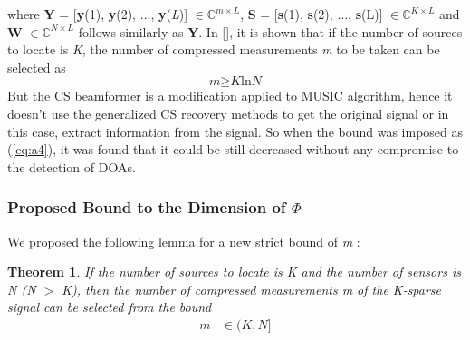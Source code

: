 \documentclass[12pt,a4paper]{article}
\theoremstyle{plain}
\newtheorem{thm}{Theorem}[section]
\theoremstyle{definition}
\begin{document}
where \textbf{Y} = [\textbf{y}(1), \textbf{y}(2), $\hdots$, \textbf{y}(\textit{L})] $\in\mathbb{C}^{m\times L}$, \textbf{S} = [\textbf{s}(1), \textbf{s}(2), $\hdots$, \textbf{s}(L)] $\in\mathbb{C}^{K\times L}$ and \textbf{W} $\in\mathbb{C}^{N\times L}$ follows similarly as \textbf{Y}. In [\citet{R14}], it is shown that if the number of sources to locate is \textit{K}, the number of compressed measurements \textit{m} to be taken can be selected as 
\begin{equation}\label{eq:a4}
\textit{m} \geq \textit{K}\text{ln}\textit{N}
\end{equation}
But the CS beamformer is a modification applied to MUSIC algorithm, hence it doesn't use the generalized CS recovery methods to get the original signal or in this case, extract information from the signal. So when the bound was imposed as (\ref{eq:a4}), it was found that it could be still decreased without any compromise to the detection of DOAs.
\subsubsection{Proposed Bound to the Dimension of $\Phi$} 
We proposed the following lemma for a new strict bound of \textit{m} :
\begin{thm}
If the number of sources to locate is \textit{K} and the number of sensors is \textit{N} (\textit{N} $>$ \textit{K}), then the number of compressed measurements \textit{m} of the \textit{K}-sparse signal can be selected from the bound
\begin{align}\label{eq:a5}
  m &\in ( \textit{K}, \textit{N}]
\end{align}
\end{thm}  
\end{document}
